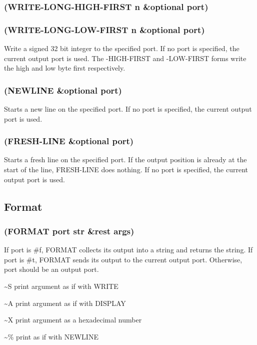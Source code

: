 \documentclass[11pt]{article}
\begin{document}
\subsubsection{(WRITE-LONG-HIGH-FIRST n \&optional port)}
\label{sec-4-34-20}
\subsubsection{(WRITE-LONG-LOW-FIRST n \&optional port)}
\label{sec-4-34-21}

Write a signed 32 bit integer to the specified port.  If no port is
specified, the current output port is used.  The -HIGH-FIRST and
-LOW-FIRST forms write the high and low byte first respectively.
\subsubsection{(NEWLINE \&optional port)}
\label{sec-4-34-22}

Starts a new line on the specified port.  If no port is specified,
the current output port is used.
\subsubsection{(FRESH-LINE \&optional port)}
\label{sec-4-34-23}

Starts a fresh line on the specified port.  If the output position is
already at the start of the line, FRESH-LINE does nothing.  If no
port is specified, the current output port is used.
\subsection{Format}
\label{sec-4-35}

\subsubsection{(FORMAT port str \&rest args)}
\label{sec-4-35-1}

If port is \#f, FORMAT collects its output into a string and returns
the string.  If port is \#t, FORMAT sends its output to the current
output port.  Otherwise, port should be an output port.

\textasciitilde{}S print argument as if with WRITE

\textasciitilde{}A print argument as if with DISPLAY

\textasciitilde{}X print argument as a hexadecimal number

\textasciitilde{}\% print as if with NEWLINE
\end{document}
